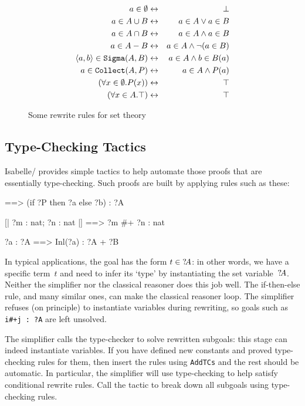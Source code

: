 \begin{figure}
\begin{eqnarray*}
  a\in \emptyset        & \leftrightarrow &  \bot\\
  a \in A \cup B      & \leftrightarrow &  a\in A \vee a\in B\\
  a \in A \cap B      & \leftrightarrow &  a\in A \wedge a\in B\\
  a \in A-B             & \leftrightarrow &  a\in A \wedge \neg (a\in B)\\
  \langle a,b\rangle\in {\tt Sigma}(A,B)
                        & \leftrightarrow &  a\in A \wedge b\in B(a)\\
  a \in {\tt Collect}(A,P)      & \leftrightarrow &  a\in A \wedge P(a)\\
  (\forall x \in \emptyset. P(x)) & \leftrightarrow &  \top\\
  (\forall x \in A. \top)       & \leftrightarrow &  \top
\end{eqnarray*}
\caption{Some rewrite rules for set theory} \label{zf-simpdata}
\end{figure}


\subsection{Type-Checking Tactics}

Isabelle/{\ZF} provides simple tactics to help automate those proofs that are
essentially type-checking.  Such proofs are built by applying rules such as
these:
\begin{ttbox}
[| ?P ==> ?a : ?A; ~ ?P ==> ?b : ?A |] ==> (if ?P then ?a else ?b) : ?A

[| ?m : nat; ?n : nat |] ==> ?m #+ ?n : nat

?a : ?A ==> Inl(?a) : ?A + ?B  
\end{ttbox}
In typical applications, the goal has the form $t\in{?\!A}$: in other words,
we have a specific term~$t$ and need to infer its `type' by instantiating the
set variable~${?\!A}$.  Neither the simplifier nor the classical reasoner
does this job well.  The if-then-else rule, and many similar ones, can make
the classical reasoner loop.  The simplifier refuses (on principle) to
instantiate variables during rewriting, so goals such as \texttt{i\#+j :\ ?A}
are left unsolved.

The simplifier calls the type-checker to solve rewritten subgoals: this stage
can indeed instantiate variables.  If you have defined new constants and
proved type-checking rules for them, then insert the rules using
\texttt{AddTCs} and the rest should be automatic.  In particular, the
simplifier will use type-checking to help satisfy conditional rewrite rules.
Call the tactic  to break down all subgoals using
type-checking rules.

